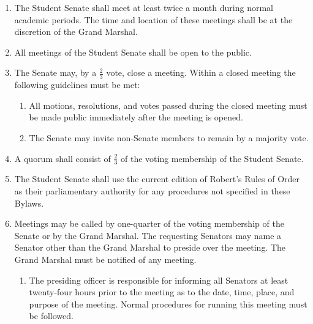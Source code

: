 \documentclass{bylaws}
\begin{document}
\begin{enumerate}
\item The Student Senate shall meet at least twice a month during normal academic periods. The time and location of these meetings
shall be at the discretion of the Grand Marshal.
\item All meetings of the Student Senate shall be open to the public.
\item The Senate may, by a $\frac{2}{3}$ vote, close a meeting. Within a closed meeting the following guidelines must be met:
\begin{enumerate}
\item All motions, resolutions, and votes passed during the closed meeting must be made public immediately after the meeting is
opened.
\item The Senate may invite non-Senate members to remain by a majority vote.
\end{enumerate}
\item A quorum shall consist of $\frac{2}{3}$ of the voting membership of the Student Senate.
\item The Student Senate shall use the current edition of Robert’s Rules of Order as their parliamentary authority for any procedures
not specified in these Bylaws.
\item Meetings may be called by one-quarter of the voting membership of the Senate or by the Grand Marshal. The requesting
Senators may name a Senator other than the Grand Marshal to preside over the meeting. The Grand Marshal must be notified of
any meeting.
\begin{enumerate}
\item The presiding officer is responsible for informing all Senators at least twenty-four hours prior to the meeting as to the date,
time, place, and purpose of the meeting. Normal procedures for running this meeting must be followed.
\end{enumerate}
\end{enumerate}
\end{document}
